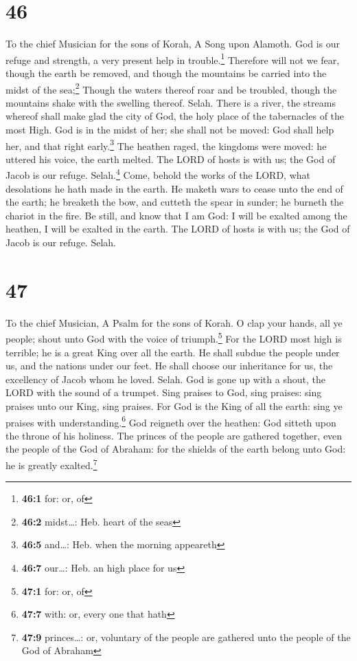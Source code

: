 \hypertarget{section-45}{%
\section{46}\label{section-45}}

To the chief Musician for the sons of Korah, A Song upon Alamoth.
 God is our refuge and strength, a very present help in
trouble.\footnote{\textbf{46:1} for: or, of}  Therefore
will not we fear, though the earth be removed, and though the mountains
be carried into the midst of the sea;\footnote{\textbf{46:2}
  midst\ldots: Heb. heart of the seas}  Though the waters
thereof roar and be troubled, though the mountains shake with the
swelling thereof. Selah.  There is a river, the streams
whereof shall make glad the city of God, the holy place of the
tabernacles of the most High.  God is in the midst of her;
she shall not be moved: God shall help her, and that right
early.\footnote{\textbf{46:5} and\ldots: Heb. when the morning appeareth}
 The heathen raged, the kingdoms were moved: he uttered
his voice, the earth melted.  The LORD of hosts is with
us; the God of Jacob is our refuge. Selah.\footnote{\textbf{46:7}
  our\ldots: Heb. an high place for us}  Come, behold the
works of the LORD, what desolations he hath made in the earth.
 He maketh wars to cease unto the end of the earth; he
breaketh the bow, and cutteth the spear in sunder; he burneth the
chariot in the fire.  Be still, and know that I am God: I
will be exalted among the heathen, I will be exalted in the earth.
 The LORD of hosts is with us; the God of Jacob is our
refuge. Selah.

\hypertarget{section-46}{%
\section{47}\label{section-46}}

To the chief Musician, A Psalm for the sons of Korah.  O
clap your hands, all ye people; shout unto God with the voice of
triumph.\footnote{\textbf{47:1} for: or, of}  For the LORD
most high is terrible; he is a great King over all the earth.
 He shall subdue the people under us, and the nations
under our feet.  He shall choose our inheritance for us,
the excellency of Jacob whom he loved. Selah.  God is gone
up with a shout, the LORD with the sound of a trumpet. 
Sing praises to God, sing praises: sing praises unto our King, sing
praises.  For God is the King of all the earth: sing ye
praises with understanding.\footnote{\textbf{47:7} with: or, every one
  that hath}  God reigneth over the heathen: God sitteth
upon the throne of his holiness.  The princes of the
people are gathered together, even the people of the God of Abraham: for
the shields of the earth belong unto God: he is greatly
exalted.\footnote{\textbf{47:9} princes\ldots: or, voluntary of the
  people are gathered unto the people of the God of Abraham}

